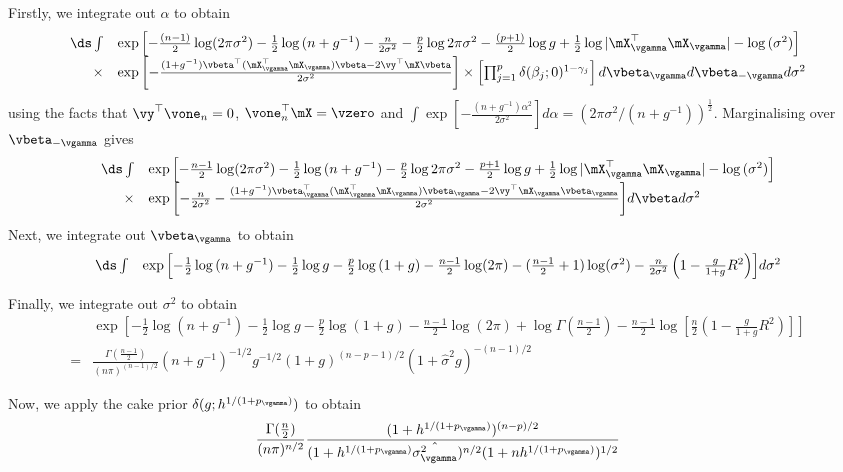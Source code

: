 \noindent Firstly, we integrate out $\alpha$ to obtain
$$
\begin{array}{rl}
		\ds \int & \exp{\left[
		-\frac{(n - 1)}{2} \log (2 \pi \sigma^2) 
		-\frac{1}{2} \log{(n + g^{-1})} 
		-\frac{n}{2 \sigma^2}
		-\frac{p}{2} \log{2\pi \sigma^2} 
		-\frac{(p + 1)}{2} \log{g} 
		+\frac{1}{2} \log{|\mX_\vgamma^\top \mX_\vgamma|}
		-\log{(\sigma^2)}
		\right]}\\
		\times&\exp{\left[
		-\frac{(1 + g^{-1})\vbeta^\top (\mX_\vgamma^\top \mX_\vgamma) \vbeta - 2 \vy^\top \mX \vbeta}{2 \sigma^{2}} 
		\right]} 
		\times \left[ \prod_{j=1}^p \delta(\beta_j; 0)^{1 - \gamma_j} \right] d \vbeta_{\vgamma} d \vbeta_{-\vgamma} d \sigma^2
\end{array}
$$
using the facts that $\vy^\top \vone_n = 0$, $\vone_n^\top \mX = \vzero$ and $\int \exp{\left[-\frac{(n + g^{-1})\alpha^2}{2 \sigma^{2}} \right]} d \alpha = (2 \pi \sigma^{2} / (n + g^{-1}))^{\frac{1}{2}}$.
Marginalising over $\vbeta_{-\vgamma}$ gives
$$
\begin{array}{rl}
		\ds \int &\exp{\left[
		-\frac{n - 1}{2} \log (2 \pi \sigma^2) 
		- \frac{1}{2} \log{(n + g^{-1})}
		-\frac{p}{2} \log{2\pi \sigma^2} 
		- \frac{p + 1}{2} \log{g}
		+ \frac{1}{2} \log{|\mX_\vgamma^\top \mX_\vgamma|} 
		-\log{(\sigma^2)}
		\right]} \\
		\times&\exp{\left[
		-\frac{n}{2 \sigma^2}
		-\frac{(1 + g^{-1})\vbeta_\vgamma^\top (\mX_\vgamma^\top \mX_\vgamma) \vbeta_\vgamma - 2\vy^\top\mX_\vgamma \vbeta_\vgamma}{2 \sigma^{2}} \right]} d \vbeta d \sigma^2
\end{array}
$$
\noindent Next, we integrate out $\vbeta_{\vgamma}$ to obtain
$$
\begin{array}{rl}
		\ds \int &\exp{\left[
		- \frac{1}{2} \log{(n + g^{-1})}
		- \frac{1}{2} \log{g}
		-\frac{p}{2} \log{(1 + g)}
		-\frac{n - 1}{2} \log (2 \pi)
		-(\frac{n - 1}{2} + 1) \log (\sigma^2) 
		-\frac{n}{2 \sigma^2} \left(1 - \frac{g}{1 + g} R^2\right)
		\right]}  d \sigma^2
\end{array}
$$

\noindent Finally, we integrate out $\sigma^2$ to obtain
\begin{equation}
\label{eq:yGivenG}
\begin{array}{rl}
		&\exp{\left[
		- \frac{1}{2} \log{(n + g^{-1})}
		- \frac{1}{2} \log{g}
		-\frac{p}{2} \log{(1 + g)}
		-\frac{n - 1}{2} \log (2 \pi)
		+\log \Gamma(\frac{n-1}{2})
		-\frac{n-1}{2}\log{[\frac{n}{2} (1 - \frac{g}{1 + g} R^2)]}
		\right]} \\
		=&\frac{\Gamma(\frac{n - 1}{2})}{(n \pi)^{(n-1)/2}}
		(n + g^{-1})^{-1/2} g^{-1/2} (1 + g)^{(n - p - 1)/2} (1 + \widehat{\sigma}^2 g)^{-(n - 1)/2}
\end{array}
\end{equation}

Now, we apply the cake prior $\delta(g; h^{1/(1 + p_\vgamma)})$ to obtain
\[
	\frac{\Gamma(\frac{n}{2})}{(n \pi)^{n/2}} \frac{(1 + h^{1/(1 + p_\vgamma)})^{(n-p)/2}}{(1 + h^{1/(1 + p_\vgamma)} \hat{\sigma^2_\vgamma})^{n/2} (1 + nh^{1/(1 + p_\vgamma)})^{1/2}}
\]

